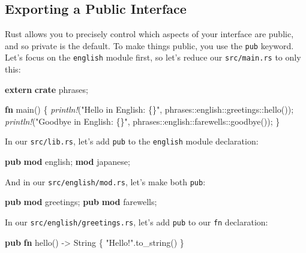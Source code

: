 \documentclass[a4paper,]{book}
\newenvironment{Shaded}{\begin{snugshade}}{\end{snugshade}}
\newcommand{\KeywordTok}[1]{\textcolor[rgb]{0.13,0.29,0.53}{\textbf{{#1}}}}
\newcommand{\DataTypeTok}[1]{\textcolor[rgb]{0.13,0.29,0.53}{{#1}}}
\newcommand{\StringTok}[1]{\textcolor[rgb]{0.31,0.60,0.02}{{#1}}}
\newcommand{\PreprocessorTok}[1]{\textcolor[rgb]{0.56,0.35,0.01}{\textit{{#1}}}}
\newcommand{\NormalTok}[1]{{#1}}
\begin{document}
\subsection{Exporting a Public
Interface}\label{exporting-a-public-interface}

Rust allows you to precisely control which aspects of your interface are
public, and so private is the default. To make things public, you use
the \texttt{pub} keyword. Let's focus on the \texttt{english} module
first, so let's reduce our \texttt{src/main.rs} to only this:

\begin{Shaded}
\begin{Highlighting}[]
\KeywordTok{extern} \KeywordTok{crate} \NormalTok{phrases;}

\KeywordTok{fn} \NormalTok{main() \{}
    \PreprocessorTok{println!}\NormalTok{(}\StringTok{"Hello in English: \{\}"}\NormalTok{, phrases::english::greetings::hello());}
    \PreprocessorTok{println!}\NormalTok{(}\StringTok{"Goodbye in English: \{\}"}\NormalTok{, phrases::english::farewells::goodbye());}
\NormalTok{\}}
\end{Highlighting}
\end{Shaded}

In our \texttt{src/lib.rs}, let's add \texttt{pub} to the
\texttt{english} module declaration:

\begin{Shaded}
\begin{Highlighting}[]
\KeywordTok{pub} \KeywordTok{mod} \NormalTok{english;}
\KeywordTok{mod} \NormalTok{japanese;}
\end{Highlighting}
\end{Shaded}

And in our \texttt{src/english/mod.rs}, let's make both \texttt{pub}:

\begin{Shaded}
\begin{Highlighting}[]
\KeywordTok{pub} \KeywordTok{mod} \NormalTok{greetings;}
\KeywordTok{pub} \KeywordTok{mod} \NormalTok{farewells;}
\end{Highlighting}
\end{Shaded}

In our \texttt{src/english/greetings.rs}, let's add \texttt{pub} to our
\texttt{fn} declaration:

\begin{Shaded}
\begin{Highlighting}[]
\KeywordTok{pub} \KeywordTok{fn} \NormalTok{hello() -> }\DataTypeTok{String} \NormalTok{\{}
    \StringTok{"Hello!"}\NormalTok{.to_string()}
\NormalTok{\}}
\end{Highlighting}
\end{Shaded}
\end{document}
